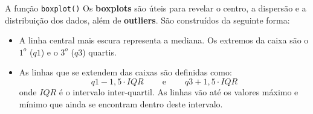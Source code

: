 \documentclass[10pt]{beamer}\usepackage[]{graphicx}\usepackage[]{color}
\makeatletter
\newcommand{\hlcom}[1]{\textcolor[rgb]{0.498,0.498,0.498}{\textit{#1}}}%
\newcommand{\hlopt}[1]{\textcolor[rgb]{0,0,0}{#1}}%
\newcommand{\hlstd}[1]{\textcolor[rgb]{0.345,0.345,0.345}{#1}}%
\newcommand{\hlkwd}[1]{\textcolor[rgb]{0.282,0.239,0.545}{\textbf{#1}}}%
\newenvironment{kframe}{%
 \def\at@end@of@kframe{}%
 \ifinner\ifhmode%
  \def\at@end@of@kframe{\end{minipage}}%
  \begin{minipage}{\columnwidth}%
 \fi\fi%
 \def\FrameCommand##1{\hskip\@totalleftmargin \hskip-\fboxsep
 \colorbox{shadecolor}{##1}\hskip-\fboxsep
     \hskip-\linewidth \hskip-\@totalleftmargin \hskip\columnwidth}%
 \MakeFramed {\advance\hsize-\width
   \@totalleftmargin\z@ \linewidth\hsize
   \@setminipage}}%
 {\par\unskip\endMakeFramed%
 \at@end@of@kframe}
\newenvironment{knitrout}{}{} %
\makeatother
\begin{document}

\begin{frame}[fragile]{A função \texttt{boxplot()}}
Os \textbf{boxplots} são úteis para revelar o centro, a dispersão e a
distribuição dos dados, além de \textbf{outliers}. São construídos da
seguinte forma:
\begin{itemize}
\item A linha central mais escura representa a mediana. Os extremos da
  caixa são o $1^{o}$ ($q1$) e o $3^{o}$ ($q3$) quartis.
\item As linhas que se extendem das caixas são definidas como:
\begin{displaymath}
q1-1,5\cdot IQR\ \qquad \mathrm{e}\ \qquad q3+1,5\cdot IQR
\end{displaymath}
onde $IQR$ é o intervalo inter-quartil. As linhas vão até os valores
máximo e mínimo que ainda se encontram dentro deste intervalo.
\end{itemize}
\end{frame}
\end{document}

